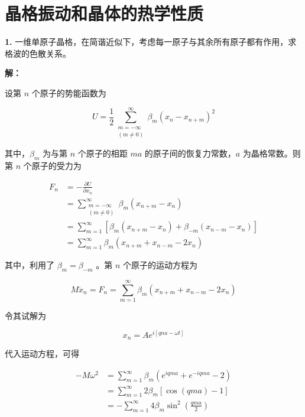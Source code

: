 \chapter{晶格振动和晶体的热学性质\label{ch:4}}

\noindent \textbf{1.\quad} 一维单原子晶格，在简谐近似下，考虑每一原子与其余所有原子都有作用，求格波的色散关系。

\noindent \textbf{解：}

设第 $n$ 个原子的势能函数为

\begin{equation*}
    U = \frac{1}{2} \sum_{\substack{m=-\infty\\(m \ne 0)}}^{\infty} \beta_m \left(x_n - x_{n+m}\right)^2
\end{equation*}

其中，$\beta_m$ 为与第 $n$ 个原子的相距 $ma$ 的原子间的恢复力常数，$a$ 为晶格常数。则第 $n$ 个原子的受力为

\begin{align*}
    F_n &= -\frac{\partial U}{\partial x_n} \\
    &= \sum_{\substack{m=-\infty\\(m \ne 0)}}^{\infty} \beta_m \left(x_{n+m} - x_n\right) \\
    &= \sum_{m=1}^{\infty} \left[\beta_m (x_{n+m}-x_n) + \beta_{-m} (x_{n-m}-x_n)\right] \\
    &= \sum_{m=1}^{\infty} \beta_m (x_{n+m}+x_{n-m}-2 x_n)
\end{align*}

其中，利用了 $\beta_m=\beta_{-m}$ 。第 $n$ 个原子的运动方程为

\begin{equation*}
    M \ddot{x}_n = F_n = \sum_{m=1}^{\infty} \beta_m (x_{n+m}+x_{n-m}-2 x_n)
\end{equation*}

令其试解为

\begin{equation*}
    x_n = A e^{i[qna-\omega t]}
\end{equation*}

代入运动方程，可得

\begin{align*}
    -M \omega^2 &= \sum_{m=1}^{\infty} \beta_m (e^{iqma} + e^{-iqma} - 2) \\
    &= \sum_{m=1}^{\infty} 2\beta_m [\cos(qma)-1] \\
    &= -\sum_{m=1}^{\infty} 4\beta_m \sin^2 \left(\frac{qma}{2}\right)
\end{align*}

